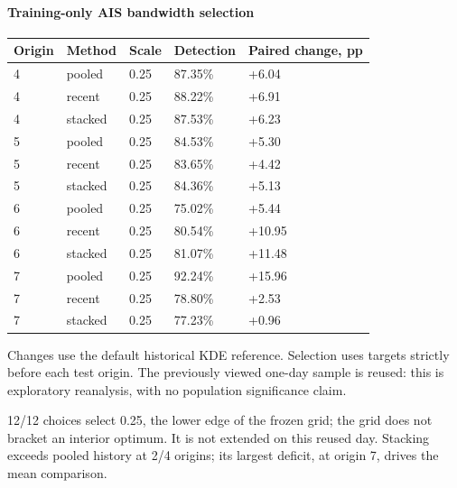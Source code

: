 \clearpage

\paragraph{Training-only AIS bandwidth selection}
\begin{center}\small\begin{tabular}{lllll}
\toprule
Origin & Method & Scale & Detection & Paired change, pp\\\midrule
4 & pooled & 0.25 & 87.35\% & +6.04\\
4 & recent & 0.25 & 88.22\% & +6.91\\
4 & stacked & 0.25 & 87.53\% & +6.23\\
5 & pooled & 0.25 & 84.53\% & +5.30\\
5 & recent & 0.25 & 83.65\% & +4.42\\
5 & stacked & 0.25 & 84.36\% & +5.13\\
6 & pooled & 0.25 & 75.02\% & +5.44\\
6 & recent & 0.25 & 80.54\% & +10.95\\
6 & stacked & 0.25 & 81.07\% & +11.48\\
7 & pooled & 0.25 & 92.24\% & +15.96\\
7 & recent & 0.25 & 78.80\% & +2.53\\
7 & stacked & 0.25 & 77.23\% & +0.96\\
\bottomrule\end{tabular}\end{center}

Changes use the default historical KDE reference. Selection uses targets strictly before each test origin. The previously viewed one-day sample is reused: this is exploratory reanalysis, with no population significance claim.

12/12 choices select 0.25, the lower edge of the frozen grid; the grid does not bracket an interior optimum. It is not extended on this reused day. Stacking exceeds pooled history at 2/4 origins; its largest deficit, at origin 7, drives the mean comparison.

